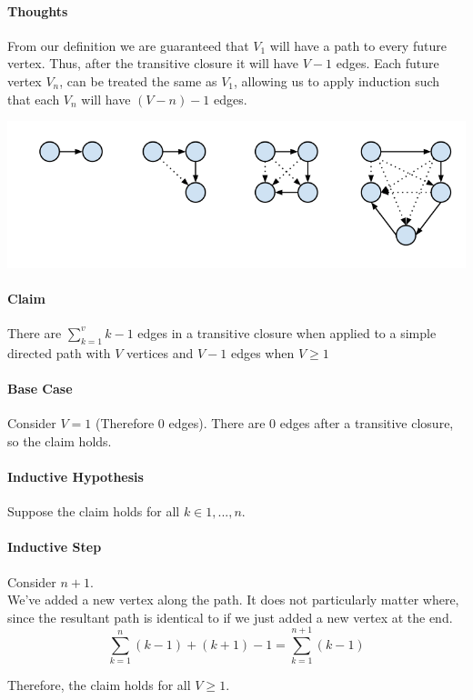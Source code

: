 \documentclass[12pt]{article}
\begin{document}
\paragraph{Thoughts}
From our definition we are guaranteed that $V_1$ will have a path to every future vertex. Thus, after the transitive closure it will have $V-1$ edges.
Each future vertex $V_n$, can be treated the same as $V_1$, allowing us to apply induction such that each $V_n$ will have $(V-n)-1$ edges.
\begin{center}
\includegraphics[width=\textwidth]{figures/closure.png}
\end{center}
\paragraph{Claim}
There are $\sum^{v}_{k=1} k-1$ edges in a transitive closure when applied to a simple directed path with $V$ vertices and $V-1$ edges when $V \geq 1$

\paragraph{Base Case}
Consider $V=1$ (Therefore $0$ edges). There are $0$ edges after a transitive closure, so the claim holds.

\paragraph{Inductive Hypothesis}
Suppose the claim holds for all $k \in {1,...,n}$.

\paragraph{Inductive Step}
Consider $n+1$. \\
We've added a new vertex along the path. It does not particularly matter where, since the resultant path is identical to if we just added a new vertex at the end.
	$$\sum^{n}_{k=1} (k-1) + (k+1)-1 = \sum^{n+1}_{k=1} (k-1)$$

Therefore, the claim holds for all $V \geq 1$.
\end{document}
